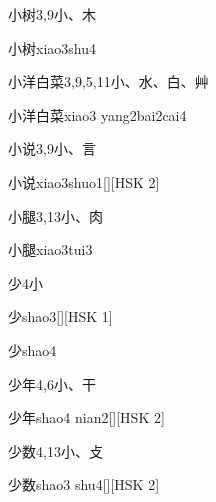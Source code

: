\begin{entry}{小树}{3,9}{⼩、⽊}
  \begin{phonetics}{小树}{xiao3shu4}
  \end{phonetics}
\end{entry}

\begin{entry}{小洋白菜}{3,9,5,11}{⼩、⽔、⽩、⾋}
  \begin{phonetics}{小洋白菜}{xiao3 yang2bai2cai4}
  \end{phonetics}
\end{entry}

\begin{entry}{小说}{3,9}{⼩、⾔}
  \begin{phonetics}{小说}{xiao3shuo1}[][HSK 2]
  \end{phonetics}
\end{entry}

\begin{entry}{小腿}{3,13}{⼩、⾁}
  \begin{phonetics}{小腿}{xiao3tui3}
  \end{phonetics}
\end{entry}

\begin{entry}{少}{4}{⼩}
  \begin{phonetics}{少}{shao3}[][HSK 1]
  \end{phonetics}
  \begin{phonetics}{少}{shao4}
  \end{phonetics}
\end{entry}

\begin{entry}{少年}{4,6}{⼩、⼲}
  \begin{phonetics}{少年}{shao4 nian2}[][HSK 2]
  \end{phonetics}
\end{entry}

\begin{entry}{少数}{4,13}{⼩、⽁}
  \begin{phonetics}{少数}{shao3 shu4}[][HSK 2]
  \end{phonetics}
\end{entry}

